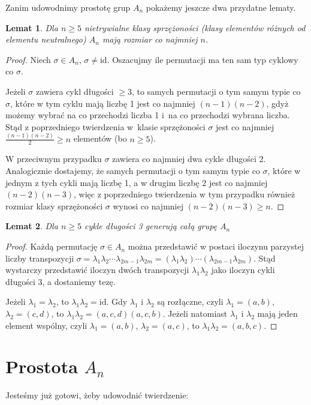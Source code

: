 \documentclass[licencjacka]{pracamgr}
\newtheorem{lemma}{Lemat}[section]
\begin{document}
Zanim udowodnimy prostotę grup $A_n$ pokażemy jeszcze dwa przydatne lematy.

\begin{lemma}\label{lemma_big_con}
	Dla $n \ge 5$ nietrywialne klasy sprzężoności (klasy elementów różnych od elementu neutralnego) $A_n$ mają rozmiar co najmniej $n$.
\end{lemma}
\begin{proof}
	Niech $\sigma \in A_n$, $\sigma \ne \mathrm{id}$.
	Oszacujmy ile permutacji ma ten sam typ cyklowy co $\sigma$.

	Jeżeli $\sigma$ zawiera cykl długości $\ge 3$, to samych permutacji o tym samym typie co $\sigma$, które w tym cyklu mają liczbę 1 jest co najmniej $(n-1)(n-2)$, 
	gdyż możemy wybrać na co przechodzi liczba 1 i~na co przechodzi wybrana liczba. 
	Stąd z poprzedniego twierdzenia w~klasie sprzężoności $\sigma$ jest co najmniej $\frac{(n-1)(n-2)}{2} \ge n$ elementów (bo $n \ge 5$).
	
	W przeciwnym przypadku $\sigma$ zawiera co najmniej dwa cykle długości 2.
	Analogicznie dostajemy, że samych permutacji o tym samym typie co $\sigma$, 
	które w jednym z tych cykli mają liczbę 1, a w drugim liczbę 2 jest co najmniej $(n-2)(n-3)$,
	więc z poprzedniego twierdzenia w tym przypadku również rozmiar klasy sprzężoności $\sigma$ wynosi co najmniej $(n-2)(n-3) \ge n$.
\end{proof}

\begin{lemma}\label{lemma_3cycles}
	Dla $n \ge 5$ cykle długości 3 generują całą grupę $A_n$
\end{lemma}
\begin{proof}
	Każdą permutację  $\sigma \in A_n$ można przedstawić w postaci iloczynu parzystej liczby transpozycji
	$\sigma = \lambda_1 \lambda_2 \cdots \lambda_{2m-1} \lambda_{2m} = (\lambda_1 \lambda_2) \cdots (\lambda_{2m-1} \lambda_{2m})$.
	Stąd wystarczy przedstawić iloczyn dwóch transpozycji $\lambda_1 \lambda_2$ jako iloczyn cykli długości 3, a dostaniemy tezę.

	Jeżeli $\lambda_1 = \lambda_2$, to $\lambda_1 \lambda_2 = \mathrm{id}$.
	Gdy $\lambda_1$ i $\lambda_2$ są rozłączne, czyli $\lambda_1 = (a, b)$, $\lambda_2 = (c, d)$, to $\lambda_1 \lambda_2 = (a, c, d)(a, c, b)$.
	Jeżeli natomiast $\lambda_1$ i $\lambda_2$ mają jeden element wspólny, 
	czyli $\lambda_1 = (a, b)$, $\lambda_2 = (a, c)$, to $\lambda_1 \lambda_2 = (a, b, c)$.
\end{proof}


\section{Prostota $A_n$}
Jesteśmy już gotowi, żeby udowodnić twierdzenie:
\end{document}
